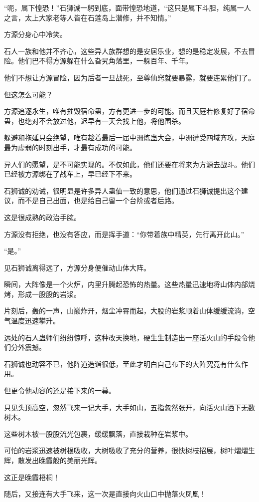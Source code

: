 \begin{this_body}
“呃，属下惶恐！”石狮诚一躬到底，面带惶恐地道，“这只是属下斗胆，纯属一人之言，太上大家老等人皆在石莲岛上潜修，并不知情。”

方源分身心中冷笑。

石人一族和他并不齐心，这些异人族群想的是安居乐业，想的是稳定发展，不去冒险。他们巴不得方源躲在什么旮旯角落里，一躲百年、千年。

他们不想让方源冒险，因为后者一旦战死，至尊仙窍就要暴露，就要连累他们了。

但这怎么可能？

方源追逐永生，唯有摧毁宿命蛊，方有更进一步的可能。而且天庭若修复好了宿命蛊，也绝对不会放过他，迟早有一天会找上他，将他围杀。

躲避和拖延只会绝望，唯有趁着最后一届中洲炼蛊大会，中洲遭受四域齐攻，天庭最为虚弱的时刻出手，才最有成功的可能。

异人们的愿望，是不可能实现的。不仅如此，他们还要在将来为方源去战斗。他们已经被方源绑在了战车上，早已经下不来。

石狮诚的劝诫，很明显是许多异人蛊仙一致的意思，他们通过石狮诚提出这个建议，而不是自己出面，也是给自己留一个台阶或者后路。

这是很成熟的政治手腕。

方源没有拒绝，也没有答应，而是挥手道：“你带着族中精英，先行离开此山。”

“是。”

见石狮诚离得远了，方源分身便催动山体大阵。

瞬间，大阵像是一个火炉，内里升腾起恐怖的热量。这些热量迅速地将山体内部烧烤，形成一股股的岩浆。

片刻后，轰的一声，山巅炸开，烟尘冲霄而起，大股的岩浆顺着山体缓缓流淌，空气温度迅速攀升。

远处的石人蛊师们纷纷惊呼，这种改天换地，硬生生制造出一座活火山的手段令他们分外震撼。

石狮诚也动容不已，他阵道造诣很低，至此才明白自己布下的大阵究竟有什么作用。

但更令他动容的还是接下来的一幕。

只见头顶高空，忽然飞来一记大手，大手如山，五指忽然张开，向活火山洒下无数树木。

这些树木被一股股流光包裹，缓缓飘落，直接栽种在岩浆中。

可怕的岩浆迅速被树根吸收，大树吸收了充分的营养，很快树枝招展，树叶熠熠生辉，散发出晚霞般的美丽光辉。

这正是晚霞梧桐！

随后，又接连有大手飞来，这一次是直接向火山口中抛落火凤凰！


\end{this_body}
